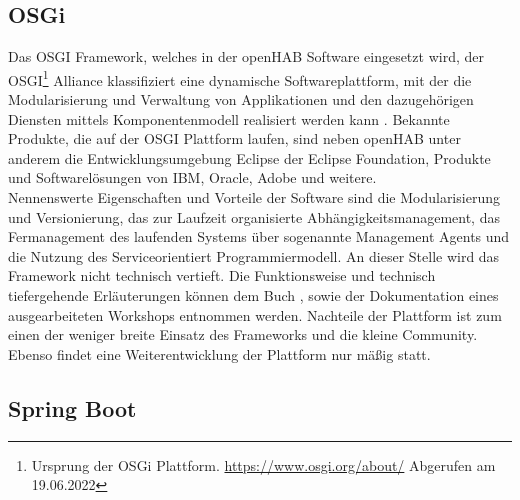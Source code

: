     \subsection{OSGi}
    \label{subsec:osgiFramework}
        Das \ac{OSGI} Framework, welches in der openHAB Software eingesetzt wird, der \acs{OSGI}\footnote{Ursprung der OSGi Plattform. \url{https://www.osgi.org/about/} Abgerufen am 19.06.2022} 
        Alliance klassifiziert eine dynamische Softwareplattform, mit der die Modularisierung und Verwaltung von Applikationen und 
        den dazugehörigen Diensten mittels Komponentenmodell realisiert werden kann \cite{funke2009}. Bekannte Produkte, die auf der 
        \acs{OSGI} Plattform laufen, sind neben openHAB unter anderem die Entwicklungsumgebung Eclipse der Eclipse Foundation, Produkte 
        und Softwarelösungen von IBM, Oracle, Adobe und weitere. 
        \\
        Nennenswerte Eigenschaften und Vorteile der Software sind die Modularisierung und Versionierung, das zur Laufzeit organisierte 
        Abhängigkeitsmanagement, das Fermanagement des laufenden Systems über sogenannte Management Agents und die Nutzung des 
        Serviceorientiert Programmiermodell. An dieser Stelle wird das Framework nicht technisch vertieft. Die Funktionsweise und technisch 
        tiefergehende Erläuterungen können dem Buch \cite{osgibuch}, sowie der Dokumentation \cite{osgipraesentation} eines ausgearbeiteten Workshops entnommen werden. 
        Nachteile der Plattform ist zum einen der weniger breite Einsatz des Frameworks und die kleine Community. 
        Ebenso findet eine Weiterentwicklung der Plattform nur mäßig statt. 

    \subsection{Spring Boot}
    \label{subsec:springBootFramework}



